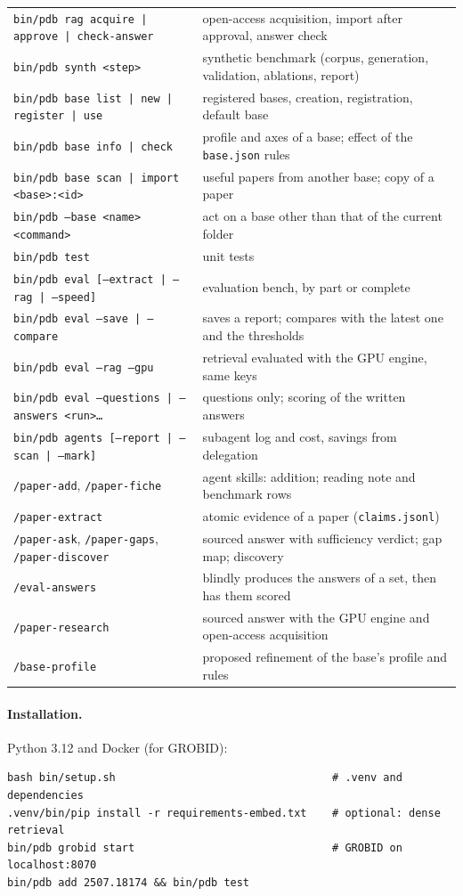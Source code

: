 \documentclass[11pt,a4paper]{article}
\newcommand{\cmd}[1]{\texttt{#1}}
\begin{document}
\begin{center}
\begin{tabularx}{\linewidth}{@{}lL@{}}
\cmd{bin/pdb rag acquire | approve | check-answer} & open-access acquisition, import after approval, answer check \\
\cmd{bin/pdb synth <step>} & synthetic benchmark (corpus, generation, validation, ablations, report) \\
\cmd{bin/pdb base list | new | register | use} & registered bases, creation, registration, default base \\
\cmd{bin/pdb base info | check} & profile and axes of a base; effect of the \cmd{base.json} rules \\
\cmd{bin/pdb base scan | import <base>:<id>} & useful papers from another base; copy of a paper \\
\cmd{bin/pdb --base <name> <command>} & act on a base other than that of the current folder \\
\cmd{bin/pdb test} & unit tests \\
\cmd{bin/pdb eval [--extract | --rag | --speed]} & evaluation bench, by part or complete \\
\cmd{bin/pdb eval --save | --compare} & saves a report; compares with the latest one and the thresholds \\
\cmd{bin/pdb eval --rag --gpu} & retrieval evaluated with the GPU engine, same keys \\
\cmd{bin/pdb eval --questions | --answers <run>…} & questions only; scoring of the written answers \\
\cmd{bin/pdb agents [--report | --scan | --mark]} & subagent log and cost, savings from delegation \\
\midrule
\cmd{/paper-add}, \cmd{/paper-fiche} & agent skills: addition; reading note and benchmark rows \\
\cmd{/paper-extract} & atomic evidence of a paper (\cmd{claims.jsonl}) \\
\cmd{/paper-ask}, \cmd{/paper-gaps}, \cmd{/paper-discover} & sourced answer with sufficiency verdict; gap map; discovery \\
\cmd{/eval-answers} & blindly produces the answers of a set, then has them scored \\
\cmd{/paper-research} & sourced answer with the GPU engine and open-access acquisition \\
\cmd{/base-profile} & proposed refinement of the base's profile and rules \\
\bottomrule
\end{tabularx}
\end{center}

\paragraph{Installation.} Python 3.12 and Docker (for GROBID):
\begin{lstlisting}
bash bin/setup.sh                                  # .venv and dependencies
.venv/bin/pip install -r requirements-embed.txt    # optional: dense retrieval
bin/pdb grobid start                               # GROBID on localhost:8070
bin/pdb add 2507.18174 && bin/pdb test
\end{lstlisting}
\end{document}
